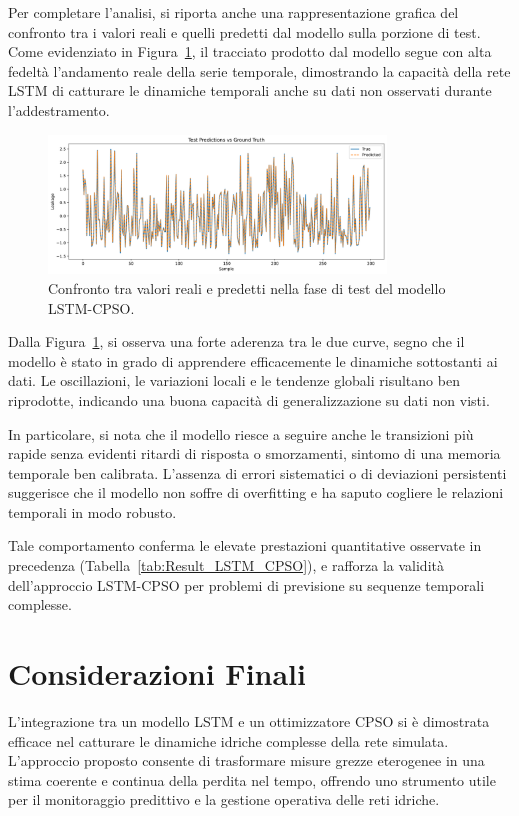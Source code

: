 \documentclass{article}
\begin{document}
Per completare l’analisi, si riporta anche una rappresentazione grafica del confronto tra i valori reali e quelli predetti dal modello sulla porzione di test. Come evidenziato in Figura~\ref{fig:test_predict}, il tracciato prodotto dal modello segue con alta fedeltà l’andamento reale della serie temporale, dimostrando la capacità della rete LSTM di catturare le dinamiche temporali anche su dati non osservati durante l’addestramento.

\begin{figure}[H]
    \centering
    \includegraphics[width=0.8\textwidth]{img/Test Predict.png}
    \caption{Confronto tra valori reali e predetti nella fase di test del modello LSTM-CPSO.}
    \label{fig:test_predict}
\end{figure}

Dalla Figura~\ref{fig:test_predict}, si osserva una forte aderenza tra le due curve, segno che il modello è stato in grado di apprendere efficacemente le dinamiche sottostanti ai dati. Le oscillazioni, le variazioni locali e le tendenze globali risultano ben riprodotte, indicando una buona capacità di generalizzazione su dati non visti.

In particolare, si nota che il modello riesce a seguire anche le transizioni più rapide senza evidenti ritardi di risposta o smorzamenti, sintomo di una memoria temporale ben calibrata. L’assenza di errori sistematici o di deviazioni persistenti suggerisce che il modello non soffre di overfitting e ha saputo cogliere le relazioni temporali in modo robusto.

Tale comportamento conferma le elevate prestazioni quantitative osservate in precedenza (Tabella~\ref{tab:Result_LSTM_CPSO}), e rafforza la validità dell’approccio LSTM-CPSO per problemi di previsione su sequenze temporali complesse.

\section{Considerazioni Finali}

L’integrazione tra un modello LSTM e un ottimizzatore CPSO si è dimostrata efficace nel catturare le dinamiche idriche complesse della rete simulata. L’approccio proposto consente di trasformare misure grezze eterogenee in una stima coerente e continua della perdita nel tempo, offrendo uno strumento utile per il monitoraggio predittivo e la gestione operativa delle reti idriche.
\end{document}

